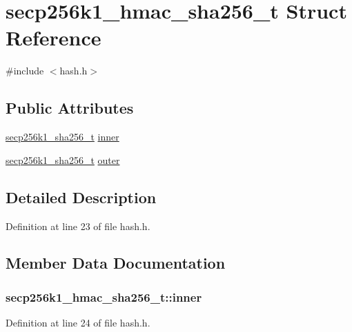\hypertarget{structsecp256k1__hmac__sha256__t}{}\section{secp256k1\+\_\+hmac\+\_\+sha256\+\_\+t Struct Reference}
\label{structsecp256k1__hmac__sha256__t}


{\ttfamily \#include $<$hash.\+h$>$}

\subsection*{Public Attributes}
\begin{DoxyCompactItemize}
\item 
\hyperlink{structsecp256k1__sha256__t}{secp256k1\+\_\+sha256\+\_\+t} \hyperlink{structsecp256k1__hmac__sha256__t_afba1e789776f5c3cd2c1e6d9e718065f}{inner}
\item 
\hyperlink{structsecp256k1__sha256__t}{secp256k1\+\_\+sha256\+\_\+t} \hyperlink{structsecp256k1__hmac__sha256__t_a3974e44471231d09a8d282ef62e0b77a}{outer}
\end{DoxyCompactItemize}


\subsection{Detailed Description}


Definition at line 23 of file hash.\+h.



\subsection{Member Data Documentation}
\hypertarget{structsecp256k1__hmac__sha256__t_afba1e789776f5c3cd2c1e6d9e718065f}{}
\subsubsection[{inner}]{ secp256k1\+\_\+hmac\+\_\+sha256\+\_\+t\+::inner}\label{structsecp256k1__hmac__sha256__t_afba1e789776f5c3cd2c1e6d9e718065f}


Definition at line 24 of file hash.\+h.

